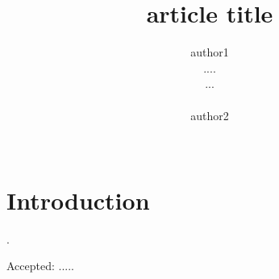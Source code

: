\documentclass[twoside,11pt,leqno]{article}
\begin{document}
\title{article title}

\author{\name author1\\
       \addr ....\\
  ...\\
       \\\email{} \AND \name author2 \\\addr \\\email{}}


\maketitle

\begin{abstract}

\end{abstract}

\begin{keywords}

\end{keywords}


\section{Introduction}





\begin{thebibliography}{99}







\end{thebibliography}.

\noindent Accepted: .....
\end{document}
